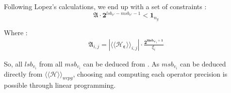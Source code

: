 %
%
%
%
		Following Lopez's calculations, we end up with a set of constraints :
		\begin{equation} \label{constraint}
			\boldsymbol{\mathfrak{A}} \cdot \boldsymbol{2}^{lsb_{v'}-msb_{v'}-1} < \boldsymbol{1}_{n_y}
		\end{equation}

		Where :
		\begin{eqnarray}
			\boldsymbol{\mathfrak{A}}_{i,j}= | \langle\langle \mathcal{H}_{\boldsymbol{\varepsilon}} \rangle\rangle_{i,j} | \cdot \frac{\boldsymbol{2^{msb_{v'_j}+1}}}{\xi_i} %
		\end{eqnarray}

		 So, all $lsb_{v_i}$ from all $msb_{v_i}$ can  be deduced from \label{constraint}.
		As $msb_{v_i}$ can be deduced directly from $\langle\langle \mathcal{H} \rangle\rangle_{wcpg}$, choosing and computing each operator precision is possible through linear programming.


		
